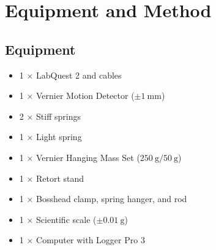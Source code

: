 \vspace{5em}
\section{Equipment and Method}

\subsection{Equipment}
\begin{itemize}
    \item 1 $\times$ LabQuest 2 and cables
    \item 1 $\times$ Vernier Motion Detector ($\pm \SI{1}{\milli\meter}$)
    \item 2 $\times$ Stiff springs
    \item 1 $\times$ Light spring
    \item 1 $\times$ Vernier Hanging Mass Set ($\SI{250}{\gram}/\SI{50}{\gram}$)
    \item 1 $\times$ Retort stand
    \item 1 $\times$ Bosshead clamp, spring hanger, and rod
    \item 1 $\times$ Scientific scale ($\pm \SI{0.01}{\gram}$)
    \item 1 $\times$ Computer with Logger Pro 3
\end{itemize}

